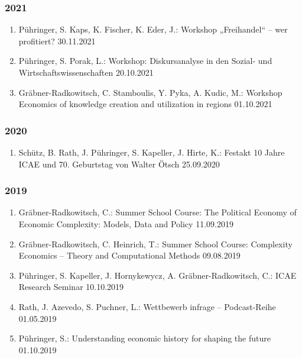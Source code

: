 \subsubsection*{2021}
\begin{enumerate}
	\item Pühringer, S. Kaps, K. Fischer, K. Eder, J.: Workshop „Freihandel“ – wer profitiert? 30.11.2021
	\item Pühringer, S. Porak, L.: Workshop: Diskursanalyse in den Sozial- und Wirtschaftswissenschaften 20.10.2021
	\item Gräbner-Radkowitsch, C. Stamboulis, Y. Pyka, A. Kudic, M.: Workshop Economics of knowledge creation and utilization in regions 01.10.2021
\end{enumerate}
\subsubsection*{2020}
\begin{enumerate}
	\item Schütz, B. Rath, J. Pühringer, S. Kapeller, J. Hirte, K.: Festakt 10 Jahre ICAE und 70. Geburtstag von Walter Ötsch 25.09.2020
\end{enumerate}
\subsubsection*{2019}
\begin{enumerate}
	\item Gräbner-Radkowitsch, C.: Summer School Course: The Political Economy of Economic Complexity: Models, Data and Policy 11.09.2019
	\item Gräbner-Radkowitsch, C. Heinrich, T.: Summer School Course: Complexity Economics -- Theory and Computational Methods 09.08.2019
	\item Pühringer, S. Kapeller, J. Hornykewycz, A. Gräbner-Radkowitsch, C.: ICAE Research Seminar 10.10.2019
	\item Rath, J. Azevedo, S. Puchner, L.: Wettbewerb infrage -- Podcast-Reihe 01.05.2019
	\item Pühringer, S.: Understanding economic history for shaping the future 01.10.2019
\end{enumerate}
